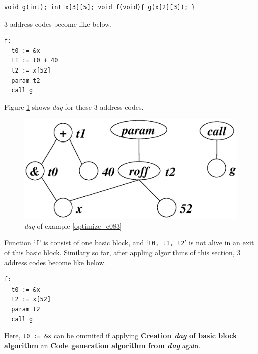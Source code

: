\begin{Example}
\label{optimize_e083}
\begin{verbatim}
void g(int); int x[3][5]; void f(void){ g(x[2][3]); }
\end{verbatim}
3 address codes become like below.
\begin{verbatim}
f:
  t0 := &x
  t1 := t0 + 40
  t2 := x[52]
  param t2
  call g
\end{verbatim}
Figure \ref{optimize_e084} shows {\em dag} for these 3 address codes.
\begin{figure}[htbp]
\begin{center}
\includegraphics[width=1.0\linewidth,height=0.509\linewidth]{opt035.eps}
\caption{{\em dag} of example \ref{optimize_e083}}
\label{optimize_e084}
\end{center}
\end{figure}
Function `{\tt{f}}' is consist of one basic block,
and `{\tt{t0, t1, t2}}' is not alive in an exit of this basic block.
Similary so far, 
after appling algorithms of this section,
3 address codes become like below.
\begin{verbatim}
f:
  t0 := &x
  t2 := x[52]
  param t2
  call g
\end{verbatim}
Here, {\tt{t0 := \&x}} can be ommited if 
applying {\bf Creation {\em dag} of basic block algorithm} an
{\bf Code generation algorithm from {\em dag}} again.
\end{Example}

